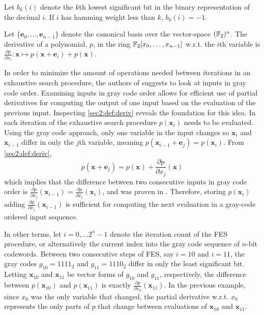\begin{defn}[] \label{sec2:def:bk}
    Let $b_k(i)$ denote the $k$th lowest significant bit
in the binary representation of the decimal $i$. If $i$ has hamming weight less than $k$, $b_k(i) = -1$.
\end{defn}

\begin{defn}[Derivatives] \label{sec2:def:deriv}
    Let $\{\mathbf{e}_0, \dots, \mathbf{e}_{n-1}\}$ denote the canonical basis over the vector-space $(\mathbb{F}_2)^n$. The derivative of a polynomial, $p$, in the ring $\mathbb{F}_2[x_0,\dots,x_{n-1}]$ w.r.t. the $i$th variable is $\frac{\partial p}{\partial x_i} : \mathbf{x} \mapsto p(\mathbf{x} + \mathbf{e}_i) + p(\mathbf{x})$.
\end{defn} 

In order to minimize the amount of operations needed between iterations in an exhaustive search procedure, the authors of \cite{ches-2010-23990} suggests to look at inputs in gray code order.
Examining inputs in gray code order allows for efficient use of partial derivatives for computing the output of one input based on the evaluation of the previous input. Inspecting \cref{sec2:def:deriv} reveals the foundation for this idea. In each iteration of the exhaustive search procedure $p(\mathbf{x}_i)$ needs to be evaluated. Using the gray code approach, only one variable in the input changes so $\mathbf{x}_i$ and $\mathbf{x}_{i - 1}$ differ in only the $j$th variable, meaning $p(\mathbf{x}_{i - 1} + \mathbf{e}_j) = p(\mathbf{x}_i)$. From \cref{sec2:def:deriv}, $$
    p(\mathbf{x} + \mathbf{e}_j) = p(\mathbf{x}) + \frac{\partial p}{\partial x_j}(\mathbf{x})
$$ 
which implies that the difference between two consecutive inputs in gray code order is $\frac{\partial p}{\partial x_j}(\mathbf{x}_{i - 1}) = \frac{\partial p}{\partial x_j}(\mathbf{x}_i)$, and was proven in \cite{tungchoumasters}. Therefore, storing $p(\mathbf{x}_i)$ adding $\frac{\partial p}{\partial x_j}(\mathbf{x}_{i-1})$ is sufficient for computing the next evaluation in a gray-code ordered input sequence.

In other terms, let $i = 0,\dots 2^n-1$ denote the iteration count of the FES procedure, or alternatively the current index into the gray code sequence of $n$-bit codewords. Between two consecutive steps of FES, say $i = 10$ and $i = 11$, the gray codes $g_{10} = 1111_2$ and $g_{11} = 1110_2$ differ in only the least significant bit. Letting $\mathbf{x}_{10}$ and $\mathbf{x}_{11}$ be vector forms of $g_{10}$ and $g_{11}$, respectively, the difference between $p(\mathbf{x}_{10})$ and $p(\mathbf{x}_{11})$ is exactly $\frac{\partial p}{\partial x_0}(\mathbf{x}_{11})$. In the previous example, since $x_0$ was the only variable that changed, the partial derivative w.r.t. $x_0$ represents the only parts of $p$ that change between evaluations of $\mathbf{x}_{10}$ and $\mathbf{x}_{11}$.


